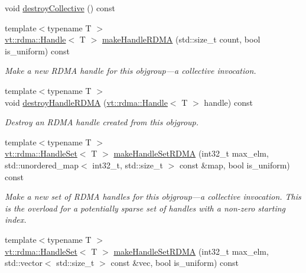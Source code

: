 \begin{DoxyCompactItemize}
\item 
void \hyperlink{structvt_1_1objgroup_1_1proxy_1_1_proxy_a6758c7979d1f69722449cb78f998cbf1}{destroy\+Collective} () const
\item 
{\footnotesize template$<$typename T $>$ }\\\hyperlink{structvt_1_1rdma_1_1_handle}{vt\+::rdma\+::\+Handle}$<$ T $>$ \hyperlink{structvt_1_1objgroup_1_1proxy_1_1_proxy_a205119186cc6b5a37d91df8eaac0500f}{make\+Handle\+R\+D\+MA} (std\+::size\+\_\+t count, bool is\+\_\+uniform) const
\begin{DoxyCompactList}\small\item\em Make a new R\+D\+MA handle for this objgroup---a collective invocation. \end{DoxyCompactList}\item 
{\footnotesize template$<$typename T $>$ }\\void \hyperlink{structvt_1_1objgroup_1_1proxy_1_1_proxy_a7510598b2915dec55b90bf9ae61c7df9}{destroy\+Handle\+R\+D\+MA} (\hyperlink{structvt_1_1rdma_1_1_handle}{vt\+::rdma\+::\+Handle}$<$ T $>$ handle) const
\begin{DoxyCompactList}\small\item\em Destroy an R\+D\+MA handle created from this objgroup. \end{DoxyCompactList}\item 
{\footnotesize template$<$typename T $>$ }\\\hyperlink{structvt_1_1rdma_1_1_handle_set}{vt\+::rdma\+::\+Handle\+Set}$<$ T $>$ \hyperlink{structvt_1_1objgroup_1_1proxy_1_1_proxy_a087ce0f4b9d0e6c38a8e5961747ae55c}{make\+Handle\+Set\+R\+D\+MA} (int32\+\_\+t max\+\_\+elm, std\+::unordered\+\_\+map$<$ int32\+\_\+t, std\+::size\+\_\+t $>$ const \&map, bool is\+\_\+uniform) const
\begin{DoxyCompactList}\small\item\em Make a new set of R\+D\+MA handles for this objgroup---a collective invocation. This is the overload for a potentially sparse set of handles with a non-\/zero starting index. \end{DoxyCompactList}\item 
{\footnotesize template$<$typename T $>$ }\\\hyperlink{structvt_1_1rdma_1_1_handle_set}{vt\+::rdma\+::\+Handle\+Set}$<$ T $>$ \hyperlink{structvt_1_1objgroup_1_1proxy_1_1_proxy_a297686853a318255a860cf7b2d63675c}{make\+Handle\+Set\+R\+D\+MA} (int32\+\_\+t max\+\_\+elm, std\+::vector$<$ std\+::size\+\_\+t $>$ const \&vec, bool is\+\_\+uniform) const

\end{DoxyCompactItemize}
